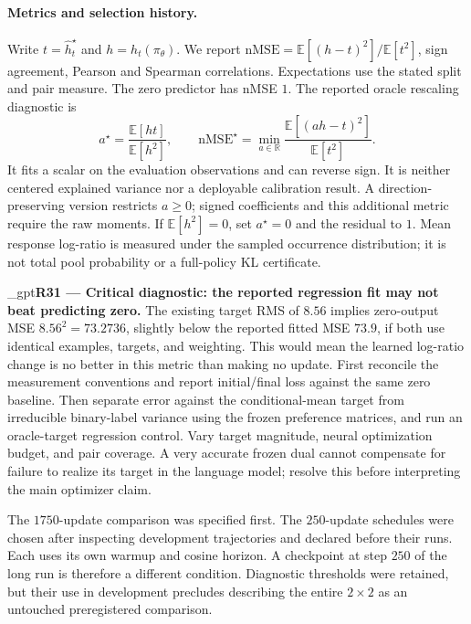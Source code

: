 \documentclass{article}
\newif\ifshowreviews
\newcommand{\reviewresponse}[1]{%
  \ifshowreviews
  \par\begingroup\color{blue!65!black}\hypersetup{allcolors=blue!65!black}\emergencystretch=2em%
  \noindent\textbf{Response:} #1\par\endgroup
  \fi}
\theoremstyle{remark}
\theoremstyle{plain}
\newcommand{\E}{\mathbb{E}}
\newcommand{\R}{\mathbb{R}}
\begin{document}
\paragraph{Metrics and selection history.}
Write $t=\widehat h_t^\star$ and $h=h_t(\pi_\theta)$. We report $\mathrm{nMSE}=\E[(h-t)^2]/\E[t^2]$, sign agreement, Pearson and Spearman correlations. Expectations use the stated split and pair measure. The zero predictor has nMSE $1$. The reported oracle rescaling diagnostic is
\[
a^\star=\frac{\E[ht]}{\E[h^2]},\qquad
\mathrm{nMSE}^\star
=\min_{a\in\R}\frac{\E[(ah-t)^2]}{\E[t^2]}.
\]
It fits a scalar on the evaluation observations and can reverse sign. It is neither centered explained variance nor a deployable calibration result. A direction-preserving version restricts $a\ge0$; signed coefficients and this additional metric require the raw moments. If $\E[h^2]=0$, set $a^\star=0$ and the residual to $1$. Mean response log-ratio is measured under the sampled occurrence distribution; it is not total pool probability or a full-policy KL certificate.


\kekim_gpt{\textbf{R31 --- Critical diagnostic: the reported regression fit may not beat predicting zero.} The existing target RMS of $8.56$ implies zero-output MSE $8.56^2=73.2736$, slightly below the reported fitted MSE $73.9$, if both use identical examples, targets, and weighting. This would mean the learned log-ratio change is no better in this metric than making no update. First reconcile the measurement conventions and report initial/final loss against the same zero baseline. Then separate error against the conditional-mean target from irreducible binary-label variance using the frozen preference matrices, and run an oracle-target regression control. Vary target magnitude, neural optimization budget, and pair coverage. A very accurate frozen dual cannot compensate for failure to realize its target in the language model; resolve this before interpreting the main optimizer claim.}
\reviewresponse{\textbf{R31 --- Partially addressed.} Inlined diagnostics now show UF-4 development nMSE $0.5861\pm0.0033$ across three policy seeds, below the zero-predictor baseline of $1$, with sign accuracy and correlation reported separately. This establishes improved fitting to the frozen finite-pool target. The historical RMS/MSE conventions and a complete sampling-error versus neural-error decomposition remain unreconciled.}

The $1750$-update comparison was specified first. The $250$-update schedules were chosen after inspecting development trajectories and declared before their runs. Each uses its own warmup and cosine horizon. A checkpoint at step $250$ of the long run is therefore a different condition. Diagnostic thresholds were retained, but their use in development precludes describing the entire $2\times2$ as an untouched preregistered comparison.
\end{document}
